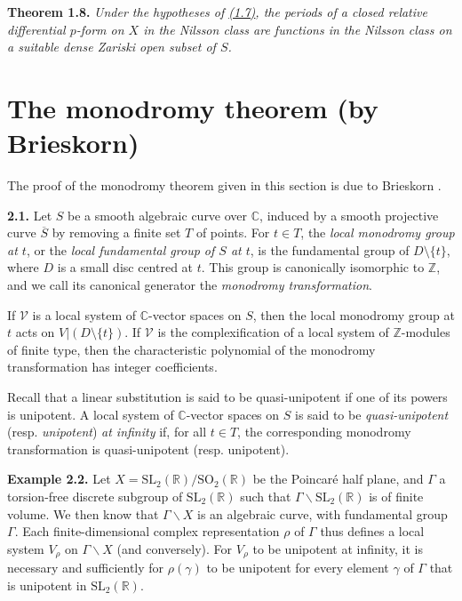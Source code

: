 \documentclass{report}
\newenvironment{itenv}[1]
  {\phantomsection\par\medskip\noindent\textbf{#1.}\itshape}
  {\par\medskip}
\newenvironment{rmenv}[1]
  {\phantomsection\par\medskip\noindent\textbf{#1.}\rmfamily}
  {\par\medskip}
\renewcommand{\cal}[1]{{\mathcal{#1}}}
\newcommand{\CC}{\mathbb{C}}
\newcommand{\ZZ}{\mathbb{Z}}
\newcommand{\SL}{\mathrm{SL}}
\newcommand{\SO}{\mathrm{SO}}
\newcommand{\oldpage}[1]{\marginpar{\footnotesize$\Big\vert$ \textit{p.~#1}}}
\begin{document}
\begin{itenv}{Theorem 1.8}
\label{III.1.8}
  Under the hypotheses of \hyperref[III.1.7]{(1.7)}, the periods of a closed relative differential $p$-form on $X$ in the Nilsson class are functions in the Nilsson class on a suitable dense Zariski open subset of $S$.
\end{itenv}


\section{The monodromy theorem (by Brieskorn)}
\label{III.2}

The proof of the monodromy theorem given in this section is due to Brieskorn \cite{5}.

\begin{rmenv}{2.1}
\label{III.2.1}
  Let $S$ be a smooth algebraic curve over $\CC$, induced by a smooth projective curve $\overline{S}$ by removing a finite set $T$ of points.
  For $t\in T$, the \emph{local monodromy group at $t$}, or the \emph{local fundamental group of $S$ at $t$}, is the fundamental group of $D\setminus\{t\}$, where $D$ is a small disc centred at $t$.
  This group is canonically isomorphic to $\ZZ$, and we call its canonical generator the \emph{monodromy transformation}.

  If $\cal{V}$ is a local system of $\CC$-vector spaces on $S$, then the local monodromy group at $t$ acts on $V|(D\setminus\{t\})$.
  If $\cal{V}$ is the complexification of a local system of $\ZZ$-modules of finite type, then the characteristic polynomial of the monodromy transformation has integer coefficients.

  Recall that a linear substitution is said to be quasi-unipotent if one of its powers is unipotent.
  A local system of $\CC$-vector spaces on $S$ is said to be \emph{quasi-unipotent} (resp. \emph{unipotent}) \emph{at infinity} if, for all $t\in T$, the corresponding monodromy transformation is quasi-unipotent (resp. unipotent).
\end{rmenv}

\oldpage{126}
\begin{rmenv}{Example 2.2}
\label{III.2.2}
  Let $X=\SL_2(\mathbb{R})/\SO_2(\mathbb{R})$ be the Poincar\'{e} half plane, and $\Gamma$ a torsion-free discrete subgroup of $\SL_2(\mathbb{R})$ such that $\Gamma\backslash\SL_2(\mathbb{R})$ is of finite volume.
  We then know that $\Gamma\backslash X$ is an algebraic curve, with fundamental group $\Gamma$.
  Each finite-dimensional complex representation $\rho$ of $\Gamma$ thus defines a local system $V_\rho$ on $\Gamma\backslash X$ (and conversely).
  For $V_\rho$ to be unipotent at infinity, it is necessary and sufficiently for $\rho(\gamma)$ to be unipotent for every element $\gamma$ of $\Gamma$ that is unipotent in $\SL_2(\mathbb{R})$.
\end{rmenv}
\end{document}
